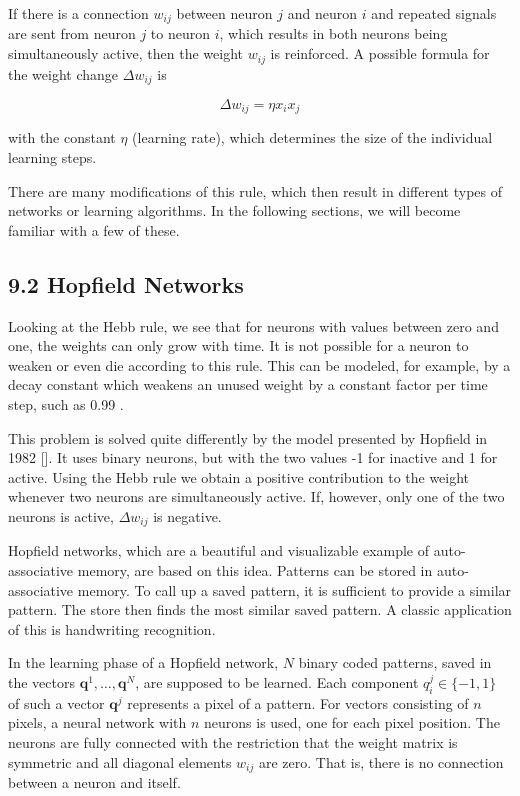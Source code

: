 \documentclass[10pt]{article}
\begin{document}
If there is a connection $w_{i j}$ between neuron $j$ and neuron $i$ and repeated signals are sent from neuron $j$ to neuron $i$, which results in both neurons being simultaneously active, then the weight $w_{i j}$ is reinforced. A possible formula for the weight change $\Delta w_{i j}$ is

$$
\Delta w_{i j}=\eta x_{i} x_{j}
$$

with the constant $\eta$ (learning rate), which determines the size of the individual learning steps.

There are many modifications of this rule, which then result in different types of networks or learning algorithms. In the following sections, we will become familiar with a few of these.

\subsection*{9.2 Hopfield Networks}
Looking at the Hebb rule, we see that for neurons with values between zero and one, the weights can only grow with time. It is not possible for a neuron to weaken or even die according to this rule. This can be modeled, for example, by a decay constant which weakens an unused weight by a constant factor per time step, such as 0.99 .

This problem is solved quite differently by the model presented by Hopfield in 1982 [\cite{hopfield1982neural}]. It uses binary neurons, but with the two values -1 for inactive and 1 for active. Using the Hebb rule we obtain a positive contribution to the weight whenever two neurons are simultaneously active. If, however, only one of the two neurons is active, $\Delta w_{i j}$ is negative.

Hopfield networks, which are a beautiful and visualizable example of auto-associative memory, are based on this idea. Patterns can be stored in auto-associative memory. To call up a saved pattern, it is sufficient to provide a similar pattern. The store then finds the most similar saved pattern. A classic application of this is handwriting recognition.

In the learning phase of a Hopfield network, $N$ binary coded patterns, saved in the vectors $\boldsymbol{q}^{1}, \ldots, \boldsymbol{q}^{N}$, are supposed to be learned. Each component $q_{i}^{j} \in\{-1,1\}$ of such a vector $\boldsymbol{q}^{j}$ represents a pixel of a pattern. For vectors consisting of $n$ pixels, a neural network with $n$ neurons is used, one for each pixel position. The neurons are fully connected with the restriction that the weight matrix is symmetric and all diagonal elements $w_{i j}$ are zero. That is, there is no connection between a neuron and itself.
\end{document}
